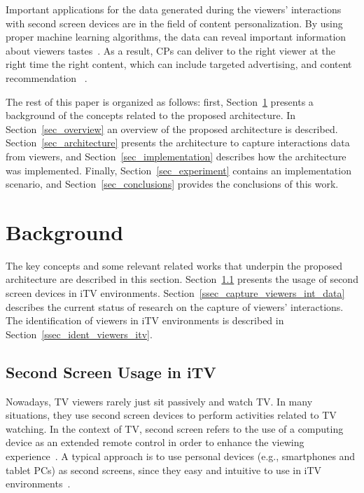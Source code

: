 \documentclass[journal]{IEEEtran}
\begin{document}
Important applications for the data generated during the viewers' interactions with second screen devices are in the field of content personalization. By using proper machine learning algorithms, the data can reveal important information about viewers tastes~\cite{Kim2012,Shin2009}. As a result, CPs can deliver to the right viewer at the right time the right content, which can include targeted advertising, and content recommendation ~\cite{DosSantos2013}.


The rest of this paper is organized as follows: first, Section~\ref{sec_background} presents a background of the concepts related to the proposed architecture. In Section~\ref{sec_overview} an overview of the proposed architecture is described. Section~\ref{sec_architecture} presents the architecture to capture interactions data from viewers, and Section~\ref{sec_implementation} describes how the architecture was implemented. Finally, Section~\ref{sec_experiment} contains 	an implementation scenario, and Section~\ref{sec_conclusions} provides the conclusions of this work.

\section{Background}
\label{sec_background}

The key concepts and some relevant related works that underpin the proposed architecture are described in this section. Section~\ref{ssec_ss_usage} presents the usage of second screen devices in iTV environments. Section~\ref{ssec_capture_viewers_int_data} describes the current status of research on the capture of viewers' interactions. The identification of viewers in iTV environments is described in Section~\ref{ssec_ident_viewers_itv}.

\subsection{Second Screen Usage in iTV}
\label{ssec_ss_usage}

Nowadays, TV viewers rarely just sit passively and watch TV. In many situations, they use second screen devices to perform activities related to TV watching. In the context of TV, second screen refers to the use of a computing device as an extended remote control in order to enhance the viewing experience~\cite{Cesar2009}. A typical approach is to use personal devices (e.g., smartphones and tablet PCs) as second screens, since they easy and intuitive to use in iTV environments~\cite{Courtois2012}.
\end{document}
